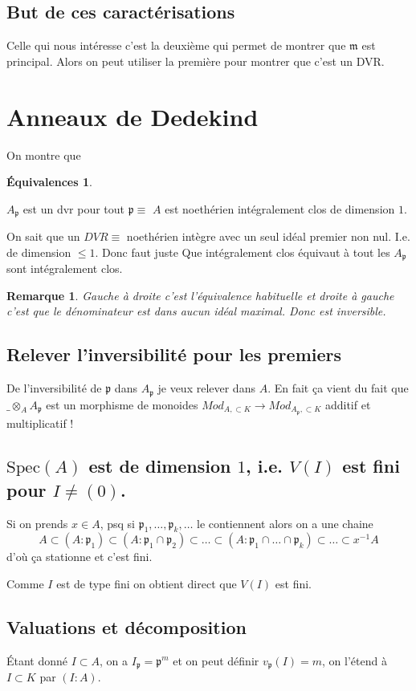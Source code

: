 \documentclass[a4paper,12pt]{book}
\newcommand{\m}{\mathfrak m}
\newcommand{\p}{\mathfrak p}
\newcommand{\Spec}{\textrm{Spec}}
\theoremstyle{plain}
\newtheorem{rem}{Remarque}
\theoremstyle{definition}
\newtheorem*{eq}{Équivalences}
\theoremstyle{remark}
\begin{document}
\subsection{But de ces caractérisations}
Celle qui nous intéresse c'est la deuxième qui permet de montrer
que $\m$ est principal. Alors on peut utiliser la première
pour montrer que c'est un DVR.

\section{Anneaux de Dedekind}
On montre que 
\begin{eq}
    \begin{center}
	$A_\p$ est un dvr pour tout $\p\equiv$ $A$ est
	noethérien intégralement clos de dimension $1$.
    \end{center}
\end{eq}
On sait que un $DVR\equiv$ noethérien intègre avec un seul
idéal premier non nul. I.e. de dimension $\leq 1$. Donc faut juste
Que intégralement clos équivaut à tout les $A_\p$ sont 
intégralement clos.
\begin{rem}
    Gauche à droite c'est l'équivalence habituelle et droite à
    gauche c'est que le dénominateur est dans aucun idéal maximal.
    Donc est inversible.
\end{rem}


\subsection{Relever l'inversibilité pour les premiers}
De l'inversibilité de $\p$ dans $A_\p$ je veux relever dans $A$.
En fait ça vient du fait que $\_\otimes_A A_\p$ est un morphisme
de monoides $Mod_{A,\subset K}\to Mod_{A_\p,\subset K}$ additif
et multiplicatif !

\subsection{$\Spec(A)$ est de dimension $1$, i.e. $V(I)$ est fini
pour $I\ne (0)$.}

Si on prends $x\in A$, psq si $\p_1,\ldots,\p_k,\ldots$ le
contiennent alors on a une chaine 
\[A\subset (A:\p_1)\subset (A:\p_1\cap \p_2)\subset \ldots\subset
(A:\p_1\cap\ldots\cap \p_k)\subset \ldots\subset x^{-1}A\]
d'où ça stationne et c'est fini. 

Comme $I$ est de type fini on obtient direct que $V(I)$ est fini.
\subsection{Valuations et décomposition}
Étant donné $I\subset A$, on a $I_\p=\p^m$ et on peut définir
$v_\p(I)=m$, on l'étend à $I\subset K$ par $(I:A)$.
\end{document}
